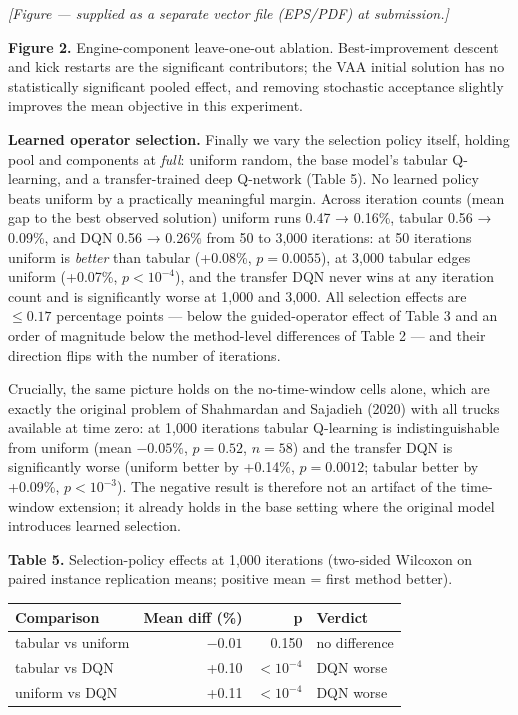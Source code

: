 \documentclass[
]{article}
\newcounter{none} %
\begin{document}
\emph{{[}Figure --- supplied as a separate vector file (EPS/PDF) at
submission.{]}}

\textbf{Figure 2.} Engine-component leave-one-out ablation.
Best-improvement descent and kick restarts are the significant
contributors; the VAA initial solution has no statistically significant
pooled effect, and removing stochastic acceptance slightly improves the
mean objective in this experiment.

\textbf{Learned operator selection.} Finally we vary the selection
policy itself, holding pool and components at \emph{full}: uniform
random, the base model's tabular Q-learning, and a transfer-trained deep
Q-network (Table 5). No learned policy beats uniform by a practically
meaningful margin. Across iteration counts (mean gap to the best observed solution) uniform runs
0.47 → 0.16\%, tabular 0.56 → 0.09\%, and DQN 0.56 → 0.26\% from 50 to
3,000 iterations: at 50 iterations uniform is \emph{better} than tabular
(+0.08\%, \(p=0.0055\)), at 3,000 tabular edges uniform (+0.07\%,
\(p<10^{-4}\)), and the transfer DQN never wins at any iteration count and is
significantly worse at 1,000 and 3,000. All selection effects are
\(\le 0.17\) percentage points --- below the guided-operator effect of
Table 3 and an order of magnitude below the method-level differences of
Table 2 --- and their direction flips with the number of iterations.

Crucially, the same picture holds on the no-time-window cells alone,
which are exactly the original problem of Shahmardan and Sajadieh (2020)
with all trucks available at time zero: at 1,000 iterations tabular
Q-learning is indistinguishable from uniform (mean \(-0.05\%\),
\(p=0.52\), \(n=58\)) and the transfer DQN is significantly worse
(uniform better by +0.14\%, \(p=0.0012\); tabular better by +0.09\%,
\(p<10^{-3}\)). The negative result is therefore not an artifact of the
time-window extension; it already holds in the base setting where the
original model introduces learned selection.

\textbf{Table 5.} Selection-policy effects at 1,000 iterations
(two-sided Wilcoxon on paired instance replication means; positive mean
= first method better).

{\def\LTcaptype{none} %
\begin{longtable}[]{@{}lrrl@{}}
\toprule\noalign{}
Comparison & Mean diff (\%) & p & Verdict \\
\midrule\noalign{}
\endhead
\bottomrule\noalign{}
\endlastfoot
tabular vs uniform & \(-0.01\) & 0.150 & no difference \\
tabular vs DQN & +0.10 & \(<10^{-4}\) & DQN worse \\
uniform vs DQN & +0.11 & \(<10^{-4}\) & DQN worse \\
\end{longtable}
}
\end{document}
